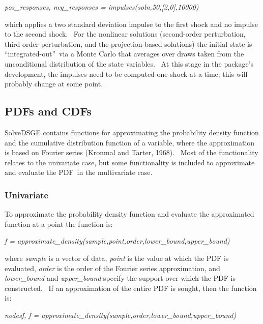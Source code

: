\documentclass[notitlepage,11pt]{article}
\begin{document}
\textit{pos\_responses, neg\_responses = impulses(soln,50,[2,0],10000)}

\bigskip 

which applies a two standard deviation impulse to the first shock and no
impulse to the second shock. \ For the nonlinear solutions (second-order
perturbation, third-order perturbation, and the projection-based solutions)
the initial state is \textquotedblleft integrated-out\textquotedblright\ via
a Monte Carlo that averages over draws taken from the unconditional
distribution of the state variables. \ At this stage in the package's
development, the impulses need to be computed one shock at a time; this will
probably change at some point.

\subsection{PDFs and CDFs}

SolveDSGE contains functions for approximating the probability density
function and the cumulative distribution function of a variable, where the
approximation is based on Fourier series (Kronmal and Tarter, 1968). \ Most
of the functionality relates to the univariate case, but some functionality
is included to approximate and evaluate the PDF\ in the multivariate case.

\subsubsection{Univariate}

To approximate the probability density function and evaluate the
approximated function at a point the function is:

\bigskip

\textit{f =
approximate\_density(sample,point,order,lower\_bound,upper\_bound)}

\bigskip

where \textit{sample} is a vector of data, \textit{point} is the value at
which the PDF is evaluated, \textit{order} is the order of the Fourier
series approximation, and \textit{lower\_bound} and \textit{upper\_bound}
specify the support over which the PDF is constructed. \ If an approximation
of the entire PDF is sought, then the function is:

\bigskip

\textit{nodesf, f =
approximate\_density(sample,order,lower\_bound,upper\_bound)}

\bigskip
\end{document}
